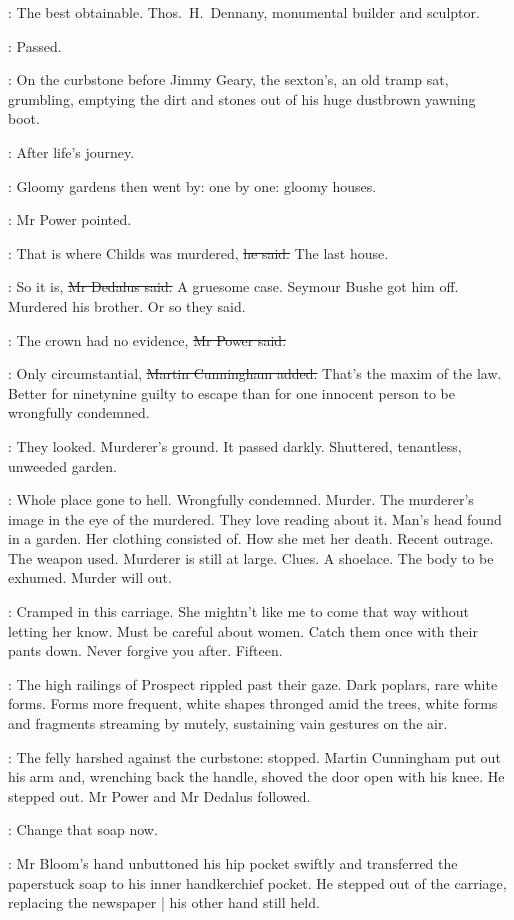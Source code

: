 \BloomInt:
The best obtainable.
Thos.~H.~Dennany, monumental builder and sculptor.

\BloomInt:
Passed.

:
On the curbstone before Jimmy Geary, the sexton's,
an old tramp sat, grumbling,
emptying the dirt and stones out of his huge dustbrown yawning boot.

\BloomInt:
After life's journey.

:
Gloomy gardens then went by:
one by one:
gloomy houses.

:
Mr Power pointed.

\power:
That is where Childs was murdered,
\sout{he said.}
The last house.

\simon:
So it is,
\sout{Mr Dedalus said.}
A gruesome case.
Seymour Bushe got him off.
Murdered his brother.
Or so they said.

\power:
The crown had no evidence,
\sout{Mr Power said.}

\cunningham:
Only circumstantial,
\sout{Martin Cunningham added.}
That's the maxim of the law.
Better for ninetynine guilty to escape
than for one innocent person to be wrongfully condemned.

:
They looked.
Murderer's ground.
It passed darkly.
Shuttered, tenantless, unweeded garden.

\BloomInt:
Whole place gone to hell.
Wrongfully condemned.
Murder.
The murderer's image in the eye of the murdered.
They love reading about it.
Man's head found in a garden.
Her clothing consisted of.
How she met her death.
Recent outrage.
The weapon used.
Murderer is still at large.
Clues.
A shoelace.
The body to be exhumed.
Murder will out.

\BloomInt:
Cramped in this carriage.
She mightn't like me to come that way without letting her know.
Must be careful about women.
Catch them once with their pants down.
Never forgive you after.
Fifteen.

:
The high railings of Prospect rippled past their gaze.
Dark poplars, rare white forms.
Forms more frequent,
white shapes thronged amid the trees,
white forms and fragments streaming by mutely,
sustaining vain gestures on the air.

:
The felly harshed against the curbstone:
stopped.
Martin Cunningham put out his arm
and, wrenching back the handle,
shoved the door open with his knee.
He stepped out.
Mr Power and Mr Dedalus followed.

\BloomInt:
Change that soap now.

:
Mr Bloom's hand unbuttoned his hip pocket swiftly
and transferred the paperstuck soap to his inner handkerchief pocket.
He stepped out of the carriage,
replacing the newspaper |
his other hand still held.
